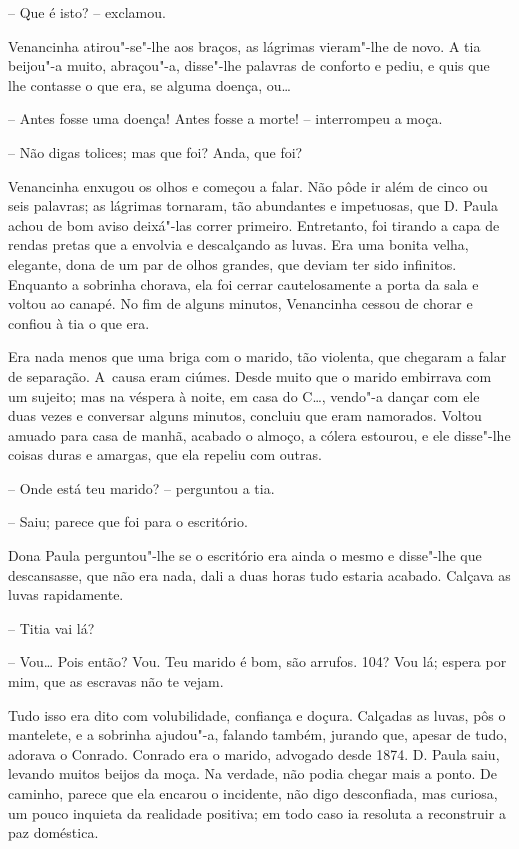 -- Que é isto? -- exclamou.

Venancinha atirou"-se"-lhe aos braços, as lágrimas vieram"-lhe de novo. A
tia beijou"-a muito, abraçou"-a, disse"-lhe palavras de conforto e pediu, e
quis que lhe contasse o que era, se alguma doença, ou\ldots{}

-- Antes fosse uma doença! Antes fosse a morte! -- interrompeu a moça.

-- Não digas tolices; mas que foi? Anda, que foi?

Venancinha enxugou os olhos e começou a falar. Não pôde ir além de cinco
ou seis palavras; as lágrimas tornaram, tão abundantes e impetuosas, que
D. Paula achou de bom aviso deixá"-las correr primeiro. Entretanto, foi
tirando a capa de rendas pretas que a envolvia e descalçando as luvas.
Era uma bonita velha, elegante, dona de um par de olhos grandes, que
deviam ter sido infinitos. Enquanto a sobrinha chorava, ela foi cerrar
cautelosamente a porta da sala e voltou ao canapé. No fim de alguns
minutos, Venancinha cessou de chorar e confiou à tia o que era.

Era nada menos que uma briga com o marido, tão violenta, que chegaram a
falar de separação. A~causa eram ciúmes. Desde muito que o marido
embirrava com um sujeito; mas na véspera à noite, em casa do C\ldots{},
vendo"-a dançar com ele duas vezes e conversar alguns minutos, concluiu
que eram namorados. Voltou amuado para casa de manhã, acabado o almoço,
a cólera estourou, e ele disse"-lhe coisas duras e amargas, que ela
repeliu com outras.

-- Onde está teu marido? -- perguntou a tia.

-- Saiu; parece que foi para o escritório.

Dona Paula perguntou"-lhe se o escritório era ainda o mesmo e disse"-lhe
que descansasse, que não era nada, dali a duas horas tudo estaria
acabado. Calçava as luvas rapidamente.

-- Titia vai lá?

-- Vou\ldots{} Pois então? Vou. Teu marido é bom, são arrufos. 104? Vou lá;
espera por mim, que as escravas não te vejam.

Tudo isso era dito com volubilidade, confiança e doçura. Calçadas as
luvas, pôs o mantelete, e a sobrinha ajudou"-a, falando também, jurando
que, apesar de tudo, adorava o Conrado. Conrado era o marido, advogado
desde 1874. D. Paula saiu, levando muitos beijos da moça. Na verdade,
não podia chegar mais a ponto. De caminho, parece que ela encarou o
incidente, não digo desconfiada, mas curiosa, um pouco inquieta da
realidade positiva; em todo caso ia resoluta a reconstruir a paz
doméstica.

